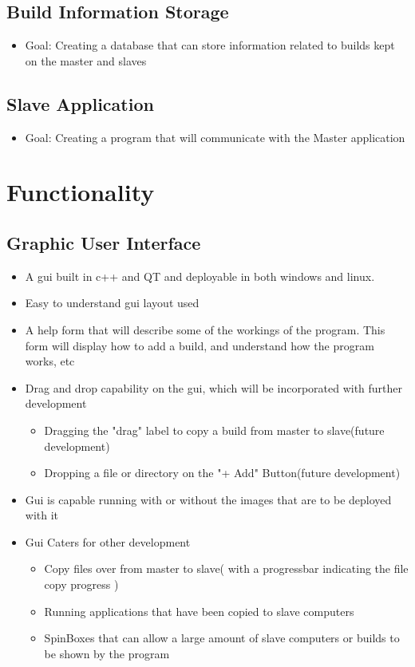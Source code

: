 \documentclass[a4paper,12pt,final]{article}
\begin{document}
\subsection{Build Information Storage}
\begin{itemize}
\item Goal: Creating a database that can store information related to builds kept on the master and slaves
\end{itemize}
\subsection{Slave Application}
\begin{itemize}
\item Goal: Creating a program that will communicate with the Master application
\end{itemize}


\section{Functionality}
\subsection{Graphic User Interface}
\begin{itemize}
\item A gui built in c++ and QT and deployable in both windows and linux.
\item Easy to understand gui layout used
\item A help form that will describe some of the workings of the program. This form will display how to add a build, and understand how the program works, etc
\item Drag and drop capability on the gui, which will be incorporated with further development
\begin{itemize}
\item Dragging the "drag" label to copy a build from master to slave(future development)
\item Dropping a file or directory on the "+ Add" Button(future development)
\end{itemize}
\item Gui is capable running with or without the images that are to be deployed with it
\item Gui Caters for other development
\begin{itemize}
\item Copy files over from master to slave( with a progressbar indicating the file copy progress )
\item Running applications that have been copied to slave computers
\item SpinBoxes that can allow a large amount of slave computers or builds to be shown by the program
\end{itemize}
\end{itemize}
\end{document}
